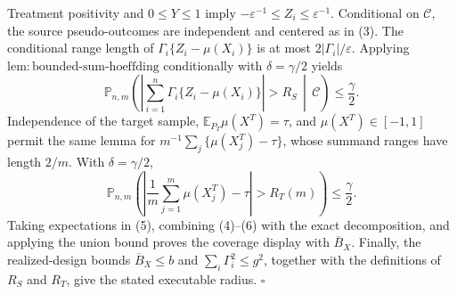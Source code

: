 Treatment positivity and \(0\le Y\le1\) imply \(-\varepsilon^{-1}\le Z_i\le\varepsilon^{-1}\). Conditional on \(\mathcal C\), the source pseudo-outcomes are independent and centered as in (3). The conditional range length of \(\Gamma_i\{Z_i-\mu(X_i)\}\) is at most \(2|\Gamma_i|/\varepsilon\). Applying \(\mathrm{lem:bounded\text{-}sum\text{-}hoeffding}\) conditionally with \(\delta=\gamma/2\) yields
\[
\mathbb P_{n,m}\!\left(
\left|\sum_{i=1}^n\Gamma_i\{Z_i-\mu(X_i)\}\right|>R_S
\,\middle|\,\mathcal C\right)\le\frac\gamma2.
\tag{5}
\]
Independence of the target sample, \(\mathbb E_{P_T}\mu(X^T)=\tau\), and \(\mu(X^T)\in[-1,1]\) permit the same lemma for \(m^{-1}\sum_j\{\mu(X_j^T)-\tau\}\), whose summand ranges have length \(2/m\). With \(\delta=\gamma/2\),
\[
\mathbb P_{n,m}\!\left(
\left|\frac1m\sum_{j=1}^m\mu(X_j^T)-\tau\right|>R_T(m)
\right)\le\frac\gamma2.
\tag{6}
\]
Taking expectations in (5), combining (4)--(6) with the exact decomposition, and applying the union bound proves the coverage display with \(\overline B_X\). Finally, the realized-design bounds \(\overline B_X\le b\) and \(\sum_i\Gamma_i^2\le g^2\), together with the definitions of \(R_S\) and \(R_T\), give the stated executable radius. \(\square\)
